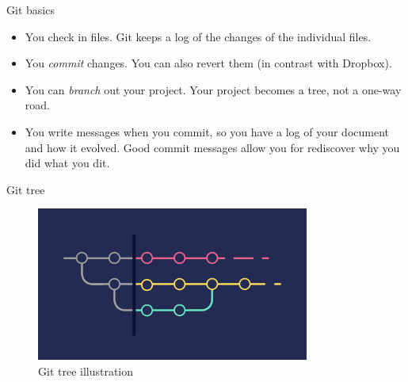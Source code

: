 \documentclass{beamer}
\begin{document}
\begin{frame}{Git basics}
    \begin{itemize}
        \item You check in files. Git keeps a log of the changes of the individual files.
        \item You \textit{commit} changes. You can also revert them (in contrast with Dropbox).
        \item You can \textit{branch} out your project. Your project becomes a tree, not a one-way road.
        \item You write messages when you commit, so you have a log of your document and how it evolved. Good commit messages allow you for rediscover why you did what you dit.
    \end{itemize}
\end{frame}

\begin{frame}{Git tree}
    \begin{figure}
        \centering
        \includegraphics[width=0.8\textwidth]{slides/improved-git-flow-2.png}
        \caption{Git tree illustration}
        \label{fig:enter-label}
    \end{figure}
\end{frame}
\end{document}

